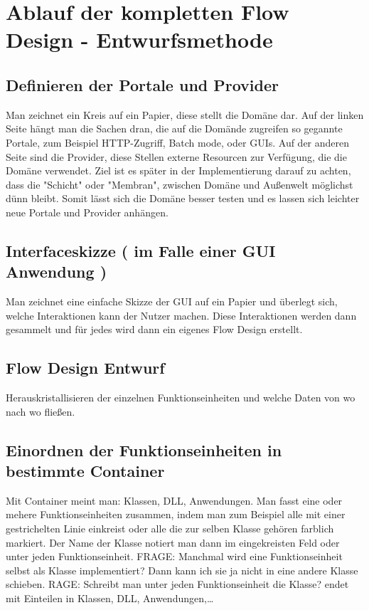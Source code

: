 \documentclass[11pt]{article}
\begin{document}
\section{Ablauf der kompletten Flow Design - Entwurfsmethode}
\label{sec:orgheadline49}

\subsection{Definieren der Portale und Provider}
\label{sec:orgheadline45}
    Man zeichnet ein Kreis auf ein Papier, diese stellt die Domäne dar.
    Auf der linken Seite hängt man die Sachen dran, die auf die Domände zugreifen so gegannte Portale, zum Beispiel HTTP-Zugriff,
    Batch mode, oder GUIs.
    Auf der anderen Seite sind die Provider, diese Stellen externe Resourcen zur Verfügung, die die Domäne verwendet.
    Ziel ist es später in der Implementierung darauf zu achten, dass die "Schicht" oder "Membran", zwischen Domäne und Außenwelt möglichst
dünn bleibt. Somit lässt sich die Domäne besser testen und es lassen sich leichter neue Portale und Provider anhängen.

\subsection{Interfaceskizze ( im Falle einer GUI Anwendung )}
\label{sec:orgheadline46}
Man zeichnet eine einfache Skizze der GUI auf ein Papier und überlegt sich, welche Interaktionen kann der Nutzer machen.
Diese Interaktionen werden dann gesammelt und für jedes wird dann ein eigenes Flow Design erstellt.

\subsection{Flow Design Entwurf}
\label{sec:orgheadline47}
Herauskristallisieren der einzelnen Funktionseinheiten und welche Daten von wo nach wo fließen.

\subsection{Einordnen der Funktionseinheiten in bestimmte Container}
\label{sec:orgheadline48}
Mit Container meint man: Klassen, DLL, Anwendungen.
Man fasst eine oder mehere Funktionseinheiten zusammen, indem man zum Beispiel alle mit einer gestrichelten Linie einkreist oder alle die zur selben Klasse
gehören farblich markiert. Der Name der Klasse notiert man dann im eingekreisten Feld oder unter jeden Funktionseinheit.
FRAGE: Manchmal wird eine Funktionseinheit selbst als Klasse implementiert? Dann kann ich sie ja nicht in eine andere Klasse schieben.
RAGE: Schreibt man unter jeden Funktionseinheit die Klasse?
  endet mit Einteilen in Klassen, DLL, Anwendungen,\ldots{}
\end{document}
